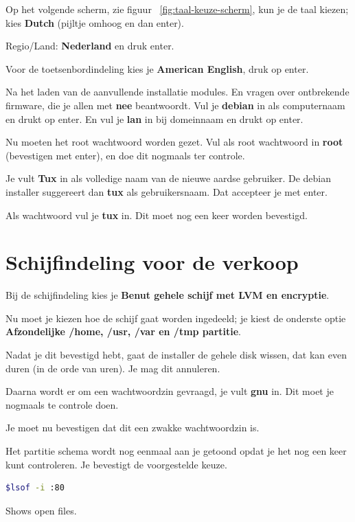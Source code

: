 \documentclass[12pt,a4paper]{article}
\begin{document}
Op het volgende scherm, zie figuur ~\ref{fig:taal-keuze-scherm},  kun je de taal kiezen; kies \textbf{Dutch} (pijltje omhoog en dan enter).


Regio/Land: \textbf{Nederland} en druk enter.

Voor de toetsenbordindeling kies je \textbf{American English}, druk op enter.

Na het laden van de aanvullende installatie modules. En vragen over ontbrekende firmware, die je allen met \textbf{nee} beantwoordt. Vul je \textbf{debian} in als computernaam en drukt op enter.
En vul je \textbf{lan} in bij domeinnaam en drukt op enter.

Nu moeten het root wachtwoord worden gezet.
Vul als root wachtwoord in \textbf{root} (bevestigen met enter), en doe dit nogmaals ter controle.

Je vult \textbf{Tux} in als volledige naam van de nieuwe aardse gebruiker.
De debian installer suggereert dan \textbf{tux} als gebruikersnaam.
Dat accepteer je met enter.

Als wachtwoord vul je \textbf{tux} in. Dit moet nog een keer worden bevestigd.
\section{Schijfindeling voor de verkoop}
Bij de schijfindeling kies je \textbf{Benut gehele schijf met LVM en encryptie}.

Nu moet je kiezen hoe de schijf gaat worden ingedeeld; je kiest de onderste optie \textbf{Afzondelijke /home, /usr, /var en /tmp partitie}.

Nadat je dit bevestigd hebt, gaat de installer de gehele disk wissen, dat kan even duren (in de orde van uren). Je mag dit annuleren.

Daarna wordt er om een wachtwoordzin gevraagd, je vult \textbf{gnu} in. Dit moet je nogmaals te controle doen.

Je moet nu bevestigen dat dit een zwakke wachtwoordzin is. 

Het partitie schema wordt nog eenmaal aan je getoond opdat je het nog een keer kunt controleren. Je bevestigt de voorgestelde keuze.

\begin{lstlisting}[language=bash]
$lsof -i :80
\end{lstlisting}
Shows open files.
\end{document}
